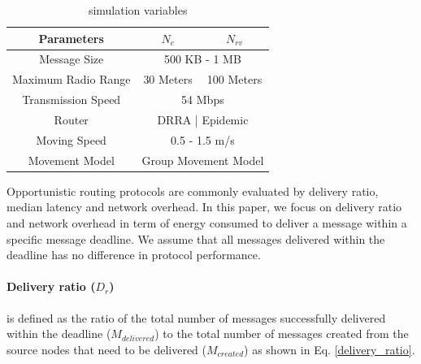 \documentclass[conference]{IEEEtran}
\begin{document}
\begin{table}[!t]
	\renewcommand{\arraystretch}{1.3}
	\caption{simulation variables}
	\label{table_parameters}
	\centering
	\begin{tabular}{|c|c|c|}
		\hline
		Parameters         &  $N_{c}$ & $N_{rv}$ \\ \hline
		Message Size       &  \multicolumn{2}{|c|}{500 KB - 1 MB}        \\ \hline
		Maximum Radio Range & 30 Meters  & 100 Meters \\ \hline
		Transmission Speed &  \multicolumn{2}{|c|}{ 54 Mbps   }        \\ \hline
		Router             & \multicolumn{2}{|c|}{ DRRA | Epidemic   } \\ \hline
		Moving Speed       &   \multicolumn{2}{|c|}{0.5 - 1.5 m/s }        \\ \hline
		Movement Model     &   \multicolumn{2}{|c|}{Group Movement Model  }      \\ \hline
	\end{tabular}
\end{table}

Opportunistic routing protocols are commonly evaluated by delivery ratio, median latency and network overhead.
In this paper, we focus on delivery ratio and network overhead in term of energy consumed to deliver a message within a specific message deadline.
We assume that all messages delivered within the deadline has no difference in protocol performance.


\paragraph{Delivery ratio ($D_{r}$)} is defined as the ratio of the total number of messages successfully delivered within the deadline ($ { M }_{ delivered }$) to the total number of messages created from the source nodes that need to be delivered ($ { M }_{ created }$) as shown in Eq. \ref{delivery_ratio}.
\end{document}

